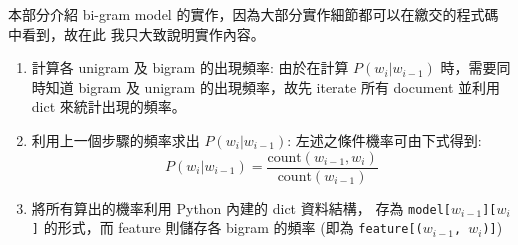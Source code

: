 \documentclass{article}[12pt]
\begin{document}
本部分介紹 bi-gram model 的實作，因為大部分實作細節都可以在繳交的程式碼中看到，故在此
我只大致說明實作內容。

\begin{enumerate}
    \item 計算各 unigram 及 bigram 的出現頻率: 由於在計算 $P(w_i|w_{i-1})$ 時，需要同時知道 bigram 及
    unigram 的出現頻率，故先 iterate 所有 document 並利用 dict 來統計出現的頻率。
    \item 利用上一個步驟的頻率求出 $P(w_i|w_{i-1})$: 左述之條件機率可由下式得到:
    \begin{equation}
        P(w_i|w_{i-1}) = \frac{\text{count}(w_{i-1}, w_i)}{\text{count}(w_{i-1})}
    \end{equation}
    \item 將所有算出的機率利用 Python 內建的 dict 資料結構，
    存為 \texttt{model[$w_{i-1}$][$w_i$]} 的形式，而 feature 則儲存各 bigram
    的頻率 (即為 \texttt{feature[($w_{i-1}$, $w_i$)]})

\end{enumerate}
\end{document}
